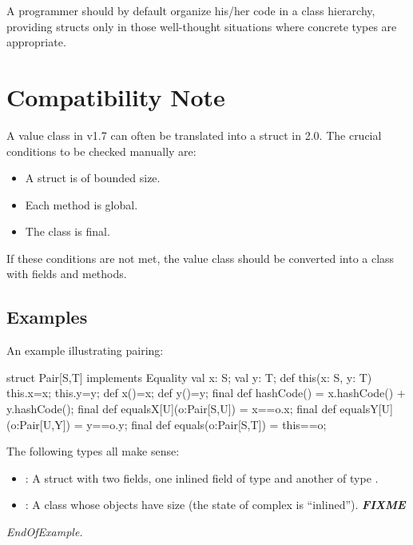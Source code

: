  A programmer should by default organize his/her code in a class
 hierarchy, providing structs only in those well-thought situations
 where concrete types are appropriate.

\section{Compatibility Note}

A value class in \Xten{} v1.7 can often be translated into a struct in \Xten{} 2.0. The crucial conditions to be checked manually are: \begin{itemize}
\item  A struct is of bounded size. 
\item  Each method is global. 
\item  The class is final.
\end{itemize}
 

If these conditions are not met, the value class should be converted
into a class with  fields and methods.

\subsection{Examples}

An example illustrating pairing:
\begin{xten}
struct Pair[S,T] implements Equality {
  val x: S;
  val y: T;
  def this(x: S, y: T) {
    this.x=x;
    this.y=y;
  }
  def x()=x;
  def y()=y;  
  final def hashCode() = x.hashCode() + y.hashCode();
  final def equalsX[U](o:Pair[S,U]) = x==o.x;
  final def equalsY[U](o:Pair[U,Y]) = y==o.y;
  final def equals(o:Pair[S,T]) = this==o;
}
\end{xten}

The following types all make sense: 
\begin{itemize}
\item {}: A struct with two fields, one inlined field of type  and another of type . 
\item {}: A class whose objects have size
   (the state of complex is
  ``inlined''). \emph\bf{FIXME}
\end{itemize}
\emph{EndOfExample.}

